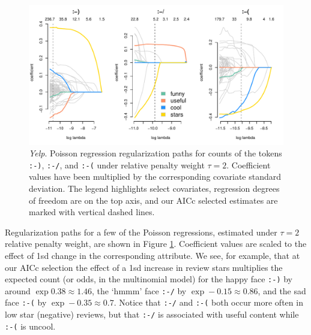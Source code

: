 \documentclass[12pt]{article}
\newcommand{\cd}[1]{{\tt#1}}
\begin{document}
\begin{figure}[b!]
\hspace{-.25in}\includegraphics[width=6.75in]{../graphs/yelp_ir_paths}
\caption{\label{yelp_ir} {\it Yelp}.  
Poisson regression regularization paths for counts of the tokens \cd{:-)},
\cd{:-/}, and
\cd{:-(} under relative penalty weight $\tau=2$.  Coefficient values have been
multiplied by the corresponding covariate standard deviation.  The legend
highlights select covariates, regression degrees of freedom are on the top
axis, and our AICc selected estimates are marked with vertical dashed lines. }
\end{figure}


Regularization paths for a few of the Poisson regressions, estimated under
$\tau=2$ relative penalty weight, are shown in Figure \ref{yelp_ir}.
Coefficient values are scaled to the effect of 1sd change in
the corresponding attribute. We see, for example, that at our AICc selection
the effect of a 1sd increase in review stars multiplies the expected count (or
odds, in the multinomial model) for the happy face
  \cd{:\!-\!)} by around $\exp 0.38 \approx 1.46$, the `hmmm' face \cd{:\!-\!/} by $\exp
  -0.15 \approx 0.86$, and the sad face \cd{:\!-\!(} by $\exp -0.35 \approx 0.7$.
 Notice that \cd{:\!-\!/} and \cd{:\!-\!(} both occur more often in low star
 (negative) reviews, but that \cd{:\!-\!/} is associated with useful content while
 \cd{:\!-\!(} is uncool.
\end{document}
